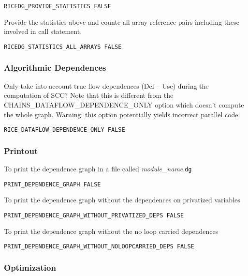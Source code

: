 \begin{verbatim}
RICEDG_PROVIDE_STATISTICS FALSE
\end{verbatim}

Provide the statistics above and counte all array reference pairs
including these involved in call statement.

\begin{verbatim}
RICEDG_STATISTICS_ALL_ARRAYS FALSE
\end{verbatim}

\subsubsection{Algorithmic Dependences}

Only take into account true flow dependences (Def -- Use) during the
computation of SCC?  Note that this is different from the
CHAINS\_DATAFLOW\_DEPENDENCE\_ONLY option which doesn't compute the
whole graph.  Warning: this option potentially yields incorrect parallel
code.

\begin{verbatim}
RICE_DATAFLOW_DEPENDENCE_ONLY FALSE
\end{verbatim}

\subsubsection{Printout}

To print the dependence graph in a file called {\em module\_name}.{\tt dg}

\begin{verbatim}
PRINT_DEPENDENCE_GRAPH FALSE
\end{verbatim}

To print the dependence graph without the dependences on privatized
variables 

\begin{verbatim}
PRINT_DEPENDENCE_GRAPH_WITHOUT_PRIVATIZED_DEPS FALSE
\end{verbatim}

To print the dependence graph without the no loop carried dependences
 
\begin{verbatim}
PRINT_DEPENDENCE_GRAPH_WITHOUT_NOLOOPCARRIED_DEPS FALSE
\end{verbatim}

\subsubsection{Optimization}

